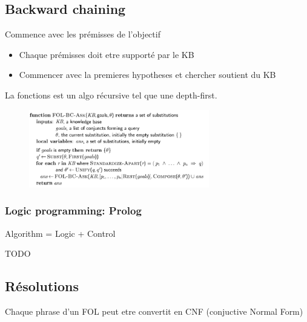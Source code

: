 \documentclass[12pt]{article}
\begin{document}
	\subsection{Backward chaining}
		Commence  avec les prémisses de l'objectif
		\begin{itemize}
			\item Chaque prémisses doit etre supporté par le KB
			\item Commencer avec la premieres hypotheses et chercher soutient du KB
			
		\end{itemize}
		
		La fonctions est un algo récursive tel que une depth-first.
		
		\begin{figure}[htp]	
			\centering
			\includegraphics[width=0.7\textwidth]{img/BackWardChaining.png}
		\end{figure}		
		
		\subsubsection{Logic programming: Prolog}
			Algorithm = Logic + Control
			
			TODO
			
	\subsection{Résolutions}
		Chaque phrase d'un FOL peut etre convertit en CNF (conjuctive Normal Form)
			
\end{document}
